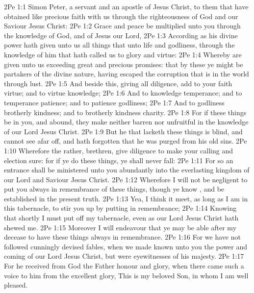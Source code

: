 \vs 2Pe 1:1 Simon Peter, a servant and an apostle of Jesus Christ, to them that have obtained like precious faith with us through the righteousness of God and our Saviour Jesus Christ:
\vs 2Pe 1:2 Grace and peace be multiplied unto you through the knowledge of God, and of Jesus our Lord,
\vs 2Pe 1:3 According as his divine power hath given unto us all things that  unto life and godliness, through the knowledge of him that hath called us to glory and virtue:
\vs 2Pe 1:4 Whereby are given unto us exceeding great and precious promises: that by these ye might be partakers of the divine nature, having escaped the corruption that is in the world through lust.
\vs 2Pe 1:5 And beside this, giving all diligence, add to your faith virtue; and to virtue knowledge;
\vs 2Pe 1:6 And to knowledge temperance; and to temperance patience; and to patience godliness;
\vs 2Pe 1:7 And to godliness brotherly kindness; and to brotherly kindness charity.
\vs 2Pe 1:8 For if these things be in you, and abound, they make  neither  barren nor unfruitful in the knowledge of our Lord Jesus Christ.
\vs 2Pe 1:9 But he that lacketh these things is blind, and cannot see afar off, and hath forgotten that he was purged from his old sins.
\vs 2Pe 1:10 Wherefore the rather, brethren, give diligence to make your calling and election sure: for if ye do these things, ye shall never fall:
\vs 2Pe 1:11 For so an entrance shall be ministered unto you abundantly into the everlasting kingdom of our Lord and Saviour Jesus Christ.
\vs 2Pe 1:12 Wherefore I will not be negligent to put you always in remembrance of these things, though ye know , and be established in the present truth.
\vs 2Pe 1:13 Yea, I think it meet, as long as I am in this tabernacle, to stir you up by putting  in remembrance;
\vs 2Pe 1:14 Knowing that shortly I must put off  my tabernacle, even as our Lord Jesus Christ hath shewed me.
\vs 2Pe 1:15 Moreover I will endeavour that ye may be able after my decease to have these things always in remembrance.
\vs 2Pe 1:16 For we have not followed cunningly devised fables, when we made known unto you the power and coming of our Lord Jesus Christ, but were eyewitnesses of his majesty.
\vs 2Pe 1:17 For he received from God the Father honour and glory, when there came such a voice to him from the excellent glory, This is my beloved Son, in whom I am well pleased.
